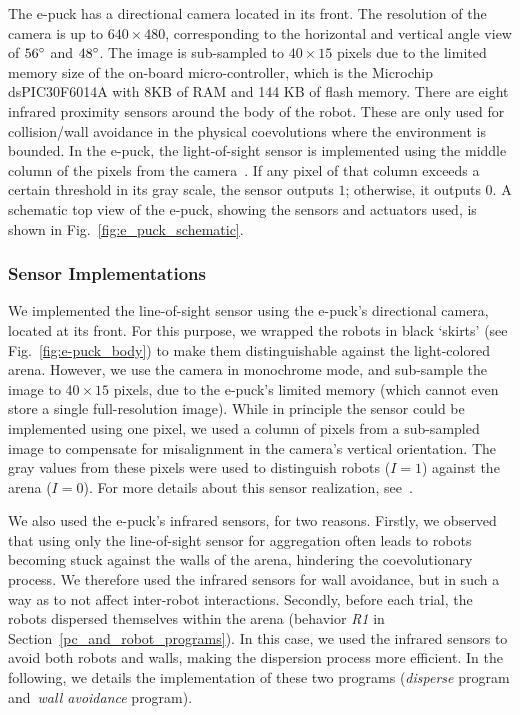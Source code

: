 The e-puck has a directional camera located in its front. The resolution of the camera is up to $640\times480$, corresponding to the horizontal and vertical angle view of $56\degree$ and $48\degree$. The image is sub-sampled to $40\times15$ pixels due to the limited memory size of the on-board micro-controller, which is the Microchip dsPIC30F6014A with 8KB of RAM and 144 KB of flash memory. There are eight infrared proximity sensors around the body of the robot. These are only used for collision/wall avoidance in the physical coevolutions where the environment is bounded. In the e-puck, the light-of-sight sensor is implemented using the middle column of the pixels from the camera~\citep{Gauci2014_ijrr}. If any pixel of that column exceeds a certain threshold in its gray scale, the sensor outputs $1$; otherwise, it outputs $0$. A schematic top view of the e-puck, showing the sensors and actuators used, is shown in Fig.~\ref{fig:e_puck_schematic}.

\subsubsection{Sensor Implementations}

We implemented the line-of-sight sensor using the e-puck's directional camera, located at its front. For this purpose, we wrapped the robots in black `skirts' (see Fig.~\ref{fig:e-puck_body}) to make them distinguishable against the light-colored arena.  However, we use the camera in monochrome mode, and sub-sample the image to $40 \times 15$ pixels, due to the e-puck's limited memory (which cannot even store a single full-resolution image). While in principle the sensor could be implemented using one pixel, we used a column of pixels from a sub-sampled image to compensate for misalignment in the camera's vertical orientation. The gray values from these pixels were used to distinguish robots ($I=1$) against the arena ($I=0$). For more details about this sensor realization, see~\cite{Gauci2014_ijrr}.

We also used the e-puck's infrared sensors, for two reasons. Firstly, we observed that using only the line-of-sight sensor for aggregation often leads to robots becoming stuck against the walls of the arena, hindering the coevolutionary process. We therefore used the infrared sensors for wall avoidance, but in such a way as to not affect inter-robot interactions.
Secondly, before each trial, the robots dispersed themselves within the arena (behavior \textit{R1} in Section~\ref{pc_and_robot_programs}). In this case, we used the infrared sensors to avoid both robots and walls, making the dispersion process more efficient. In the following, we details the implementation of these two programs (\textit{disperse} program and~\textit{wall avoidance} program). 

